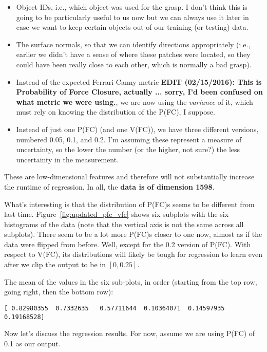 \documentclass[a4paper, 11pt]{article}
\begin{document}
\begin{itemize}
    \item Object IDs, i.e., which object was used for the grasp. I don't think this is going to be
    particularly useful to us now but we can always use it later in case we want to keep certain
    objects out of our training (or testing) data.
    \item The surface normals, so that we can identify directions appropriately (i.e., earlier we
    didn't have a sense of where these patches were located, so they could have been really close to
    each other, which is normally a bad grasp).
    \item Instead of the expected Ferrari-Canny metric \textbf{EDIT (02/15/2016): This is
    Probability of Force Closure, actually ... sorry, I'd been confused on what metric we were
    using.}, we are now using the \emph{variance} of it, which must rely on knowing the distribution
    of the P(FC), I suppose.
    \item Instead of just one P(FC) (and one V(FC)), we have three different versions, numbered
    0.05, 0.1, and 0.2. I'm assuming these represent a measure of uncertainty, so the lower the
    number (or the higher, not sure?) the less uncertainty in the measurement.
\end{itemize}

These are low-dimensional features and therefore will not substantially increase the runtime of
regression. In all, the \textbf{data is of dimension 1598}.

What's interesting is that the distribution of P(FC)s seems to be different from last time.
Figure~\ref{fig:updated_pfc_vfc} shows six subplots with the six histograms of the data (note that
the vertical axis is not the same across all subplots). There seem to be a lot more P(FC)s closer to
one now, almost as if the data were flipped from before. Well, except for the 0.2 version of P(FC).
With respect to V(FC), its distributions will likely be tough for regression to learn even after we
clip the output to be in $[0,0.25]$.

The mean of the values in the six sub-plots, in order (starting from the top row, going right,
then the bottom row):

\begin{verbatim}
[ 0.82980355  0.7332635   0.57711644  0.10364071  0.14597935  0.19168528]
\end{verbatim}

Now let's discuss the regression results. For now, assume we are using P(FC) of 0.1 as our output.
\end{document}
